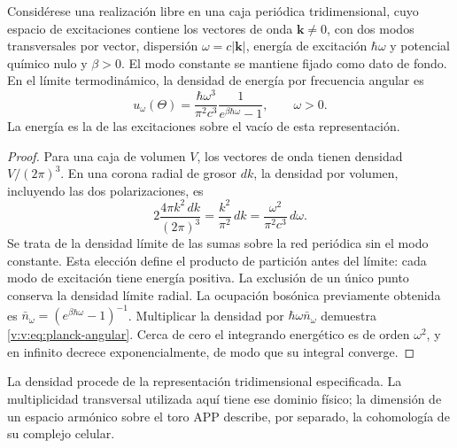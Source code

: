 \begin{proposition}
\label{v:v:prop:ley-espectral}
Considérese una realización libre en una caja periódica tridimensional,
cuyo espacio de excitaciones contiene los vectores de onda
\(\mathbf k\ne0\), con dos modos transversales por vector, dispersión
\(\omega=c|\mathbf k|\), energía de excitación \(\hbar\omega\) y
potencial químico nulo y \(\beta>0\). El modo constante se mantiene
fijado como dato de fondo. En el límite termodinámico, la densidad de energía
por frecuencia angular es
\begin{equation}
 u_\omega(\Theta)=\frac{\hbar\omega^3}{\pi^2c^3}
 \frac{1}{e^{\beta\hbar\omega}-1},\qquad \omega>0.
 \label{v:v:eq:planck-angular}
\end{equation}
La energía es la de las excitaciones sobre el vacío de esta
representación.
\end{proposition}

\begin{proof}
Para una caja de volumen \(V\), los vectores de onda tienen densidad
\(V/(2\pi)^3\). En una corona radial de grosor \(dk\), la densidad
por volumen, incluyendo las dos polarizaciones, es
\[
 2\frac{4\pi k^2\,dk}{(2\pi)^3}=\frac{k^2}{\pi^2}\,dk
 =\frac{\omega^2}{\pi^2c^3}\,d\omega.
\]
Se trata de la densidad límite de las sumas sobre la red periódica
sin el modo constante. Esta elección define el producto de partición
antes del límite: cada modo de excitación tiene energía positiva.
La exclusión de un único punto conserva la densidad límite radial.
La ocupación bosónica previamente obtenida es
\(\bar n_\omega=(e^{\beta\hbar\omega}-1)^{-1}\).
Multiplicar la densidad por \(\hbar\omega\bar n_\omega\) demuestra
\eqref{v:v:eq:planck-angular}. Cerca de cero el integrando energético es
de orden \(\omega^2\), y en infinito decrece exponencialmente, de modo
que su integral converge.
\end{proof}

La densidad procede de la representación tridimensional especificada.
La multiplicidad transversal utilizada aquí tiene ese dominio físico;
la dimensión de un espacio armónico sobre el toro APP describe, por
separado, la cohomología de su complejo celular.


